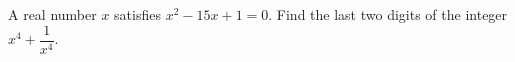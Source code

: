 A real number $x$ satisfies $x^2-15x+1=0$. Find the last two digits of the integer $x^4+\dfrac{1}{x^4}$.
